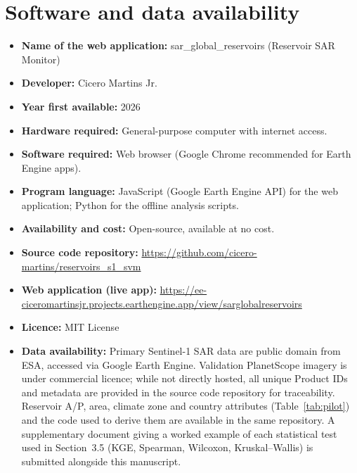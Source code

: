 \documentclass[review,12pt,authoryear]{elsarticle}
\begin{document}
\section*{Software and data availability}
\begin{itemize}
  \item \textbf{Name of the web application:} sar\_global\_reservoirs (Reservoir SAR Monitor)
  \item \textbf{Developer:} Cicero Martins Jr.
  \item \textbf{Year first available:} 2026
  \item \textbf{Hardware required:} General-purpose computer with internet access.
  \item \textbf{Software required:} Web browser (Google Chrome recommended for Earth Engine apps).
  \item \textbf{Program language:} JavaScript (Google Earth Engine API) for the
  web application; Python for the offline analysis scripts.
  \item \textbf{Availability and cost:} Open-source, available at no cost.
  \item \textbf{Source code repository:} \url{https://github.com/cicero-martins/reservoirs_s1_svm}
  \item \textbf{Web application (live app):} \url{https://ee-ciceromartinsjr.projects.earthengine.app/view/sarglobalreservoirs}
  \item \textbf{Licence:} MIT License
  \item \textbf{Data availability:} Primary Sentinel-1 SAR data are public
  domain from ESA, accessed via Google Earth Engine. Validation PlanetScope
  imagery is under commercial licence; while not directly hosted, all unique
  Product IDs and metadata are provided in the source code repository for
  traceability. Reservoir A/P, area, climate zone and country attributes
  (Table~\ref{tab:pilot}) and the code used to derive them are available in
  the same repository. A supplementary document giving a worked example of
  each statistical test used in Section~3.5 (KGE, Spearman, Wilcoxon,
  Kruskal--Wallis) is submitted alongside this manuscript.
\end{itemize}



\end{document}
